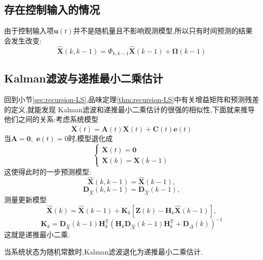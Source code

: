 \documentclass[cn,10pt,citestyle=gb7714-2015,bibstyle=gb7714-2015]{elegantbook}
\newcommand{\mT}{\mathrm{T}}
\begin{document}
\subsection{存在控制输入的情况}
由于控制输入项$\bm{u}(t)$并不是随机量且不影响观测模型,所以只有时间预测的结果会发生改变:
\begin{equation}
  \hat{\bm{X}}(k,k-1)=\bm{\varPhi}_{k,k-1}\hat{\bm{X}}(k-1)+\bm{\Omega}(k-1)
\end{equation}
\subsection{Kalman滤波与递推最小二乘估计}
回到小节\ref{sec:recursion-LS},品味定理\ref{thm:recursion-LS}中有关增益矩阵和预测残差的定义,就能发现
Kalman滤波和递推最小二乘估计的很强的相似性,下面就来推导他们之间的关系:考虑系统模型
\[
  \dot{\bm{X}}(t)=\bm{A}(t)\bm{X}(t)+\bm{C}(t)\bm{e}(t)
\]
当$\bm{A}=\bm{0}$,\ $\bm{e}(t)=0$时,模型退化成
\[
  \begin{cases}
    \dot{\bm{X}}(t)=\bm{0}\\
    \bm{X}(k)=\bm{X}(k-1)
  \end{cases}
\]
这使得此时的一步预测模型:
\[
  \hat{\bm{X}}(k,k-1)=\hat{\bm{X}}(k-1),
\]
\[
  \bm{D}_{\hat{X}}(k,k-1)=\bm{D}_{\hat{X}}(k-1),
\]
测量更新模型
\begin{equation}
  \hat{\bm{X}}(k)=\hat{\bm{X}}(k-1)+\bm{K}_k\left[\bm{Z}(k)-\bm{H}_k\hat{\bm{X}}(k-1)\right],
\end{equation}
\begin{equation}
  \bm{K}_k=\bm{D}_{\hat{X}}(k-1)\bm{H}_k^\mT\left(\bm{H}_k\bm{D}_{\hat{X}}(k-1)\bm{H}_k^\mT+\bm{D}_{\varDelta}(k)\right)^{-1}
\end{equation}
这就是递推最小二乘.
\begin{proposition}[Kalman滤波与递推最小二乘估计的关系]
  当系统状态为随机常数时,Kalman滤波退化为递推最小二乘估计.
\end{proposition}
\end{document}
